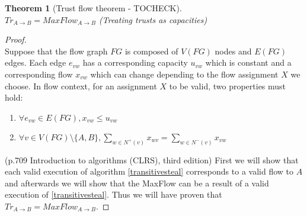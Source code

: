 \documentclass[11pt]{article}
\newtheorem{theorem}{Theorem}[section]
\theoremstyle{definition}
\theoremstyle{corollary}
\theoremstyle{lemma}
\begin{document}
    \begin{theorem}[Trust flow theorem - TOCHECK] \ \\
    \label{trustflow}
       $Tr_{A \rightarrow B} = MaxFlow_{A \rightarrow B}$ (Treating trusts as capacities)
    \end{theorem}
    \begin{proof} \ \\
       Suppose that the flow graph $FG$ is composed of $V(FG)$ nodes and $E(FG)$ edges. Each edge $e_{vw}$ has a
       corresponding capacity $u_{vw}$ which is constant and a corresponding flow $x_{vw}$ which can change depending to the
       flow assignment $X$ we choose. In flow context, for an assignment $X$ to be valid, two properties must hold:
       \begin{enumerate}
          \item $\forall e_{vw} \in E(FG), x_{vw} \leq u_{vw}$
          \item $\forall v \in V(FG) \setminus \{A,B\}, \sum\limits_{w \in N^{+}(v)}x_{wv} =
                \sum\limits_{w \in N^{-}(v)}x_{vw}$
       \end{enumerate} (p.709 Introduction to algorithms (CLRS), third edition)
       First we will show that each valid execution of algorithm \ref{transitivesteal} corresponds to a valid flow to $A$ and
       afterwards we will show that the MaxFlow can be a result of a valid execution of \ref{transitivesteal}. Thus we will
       have proven that $Tr_{A \rightarrow B} = MaxFlow_{A \rightarrow B}$.
\end{proof}
\end{document}
